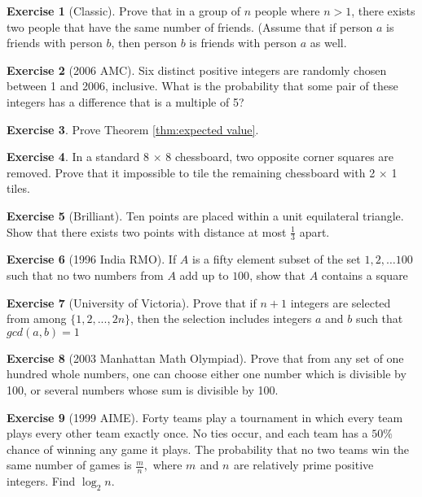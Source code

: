 \documentclass[l1pt]{article}
\theoremstyle{plain}
\theoremstyle{definition}
\newtheorem{exercise}{Exercise}[section]
\theoremstyle{remark}
\begin{document}
\begin{exercise}[Classic]
Prove that in a group of $n$ people where $n>1$, there exists two people that have the same number of friends. (Assume that if person $a$ is friends with person $b$, then person $b$ is friends with person $a$ as well. 
\end{exercise}

\begin{exercise}[2006 AMC]
 Six distinct positive integers are randomly chosen between 1 and 2006, inclusive. What is the probability that some pair of these integers has a difference that is a multiple of 5?
\end{exercise}

\begin{exercise}
 Prove Theorem \ref{thm:expected value}.
\end{exercise}

\begin{exercise}
In a standard 8 $\times$ 8 chessboard, two opposite corner squares are removed. Prove that it impossible to tile the remaining chessboard with 2 $\times$ 1 tiles.
\end{exercise}

\begin{exercise}[Brilliant]
Ten points are placed within a unit equilateral triangle. Show that there exists two points with distance at most $\frac{1}{3}$ apart.
\end{exercise}

\begin{exercise}[1996 India RMO]
 If $A$ is a fifty element subset of the set $1,2,\ldots 100$ such that no two numbers from $A$ add up to $100$, show that $A$ contains a square
\end{exercise}

\begin{exercise}[University of Victoria]
 Prove that if $n + 1$ integers are selected from among $\{1, 2,..., 2n\}$, then the selection includes integers $a$ and $b$ such that $gcd(a,b)=1$
\end{exercise}

\begin{exercise}[2003 Manhattan Math Olympiad]
 Prove that from any set of one hundred whole numbers, one can choose either one number which is divisible by 100, or several numbers whose sum is divisible by 100.
\end{exercise}

\begin{exercise}[1999 AIME]
 Forty teams play a tournament in which every team plays every other team exactly once. No ties occur, and each team has a $50 \%$ chance of winning any game it plays. The probability that no two teams win the same number of games is $\frac mn,$ where $m_{}$ and $n_{}$ are relatively prime positive integers. Find $\log_2 n.$
\end{exercise}
\end{document}
